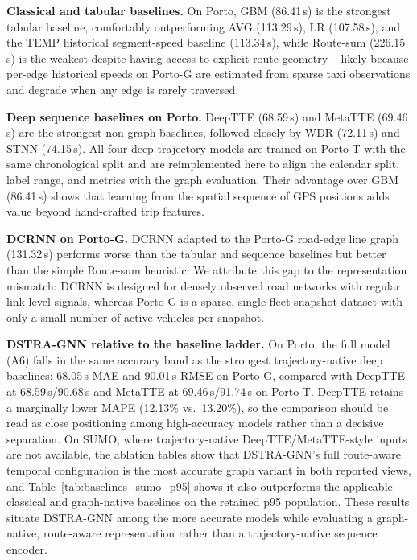 \textbf{Classical and tabular baselines.} On Porto, GBM (86.41\,s) is the strongest tabular baseline, comfortably outperforming AVG (113.29\,s), LR (107.58\,s), and the TEMP historical segment-speed baseline (113.34\,s), while Route-sum (226.15\,s) is the weakest despite having access to explicit route geometry -- likely because per-edge historical speeds on Porto-G are estimated from sparse taxi observations and degrade when any edge is rarely traversed.

\textbf{Deep sequence baselines on Porto.} DeepTTE (68.59\,s) and MetaTTE (69.46\,s) are the strongest non-graph baselines, followed closely by WDR (72.11\,s) and STNN (74.15\,s). All four deep trajectory models are trained on Porto-T with the same chronological split and are reimplemented here to align the calendar split, label range, and metrics with the graph evaluation. Their advantage over GBM (86.41\,s) shows that learning from the spatial sequence of GPS positions adds value beyond hand-crafted trip features.

\textbf{DCRNN on Porto-G.} DCRNN adapted to the Porto-G road-edge line graph (131.32\,s) performs worse than the tabular and sequence baselines but better than the simple Route-sum heuristic. We attribute this gap to the representation mismatch: DCRNN is designed for densely observed road networks with regular link-level signals, whereas Porto-G is a sparse, single-fleet snapshot dataset with only a small number of active vehicles per snapshot.

\textbf{DSTRA-GNN relative to the baseline ladder.} On Porto, the full model (A6) falls in the same accuracy band as the strongest trajectory-native deep baselines: 68.05\,s MAE and 90.01\,s RMSE on Porto-G, compared with DeepTTE at 68.59\,s/90.68\,s and MetaTTE at 69.46\,s/91.74\,s on Porto-T. DeepTTE retains a marginally lower MAPE (12.13\% vs.\ 13.20\%), so the comparison should be read as close positioning among high-accuracy models rather than a decisive separation. On SUMO, where trajectory-native DeepTTE/MetaTTE-style inputs are not available, the ablation tables show that DSTRA-GNN's full route-aware temporal configuration is the most accurate graph variant in both reported views, and Table~\ref{tab:baselines_sumo_p95} shows it also outperforms the applicable classical and graph-native baselines on the retained p95 population. These results situate DSTRA-GNN among the more accurate models while evaluating a graph-native, route-aware representation rather than a trajectory-native sequence encoder.
